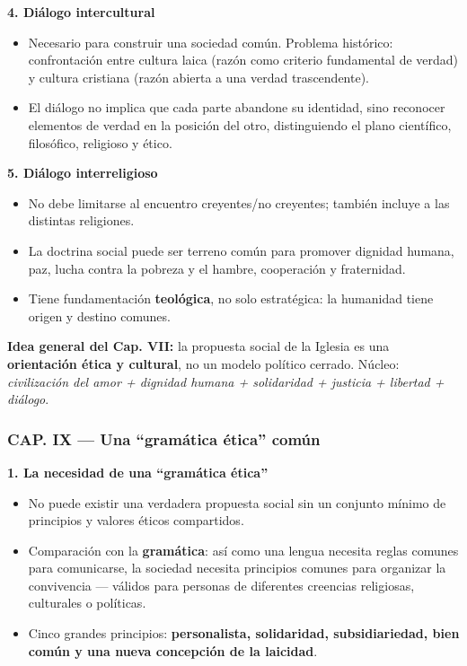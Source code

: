 \documentclass[10pt,a4paper]{article}
\begin{document}
\medskip\noindent \textbf{4. Diálogo intercultural}\par\nopagebreak
\begin{itemize}
\item Necesario para construir una sociedad común. Problema histórico: confrontación entre cultura laica (razón como criterio fundamental de verdad) y cultura cristiana (razón abierta a una verdad trascendente).
\item El diálogo no implica que cada parte abandone su identidad, sino reconocer elementos de verdad en la posición del otro, distinguiendo el plano científico, filosófico, religioso y ético.
\end{itemize}

\medskip\noindent \textbf{5. Diálogo interreligioso}\par\nopagebreak
\begin{itemize}
\item No debe limitarse al encuentro creyentes/no creyentes; también incluye a las distintas religiones.
\item La doctrina social puede ser terreno común para promover dignidad humana, paz, lucha contra la pobreza y el hambre, cooperación y fraternidad.
\item Tiene fundamentación \textbf{teológica}, no solo estratégica: la humanidad tiene origen y destino comunes.
\end{itemize}

\noindent \textbf{Idea general del Cap. VII:} la propuesta social de la Iglesia es una \textbf{orientación ética y cultural}, no un modelo político cerrado. Núcleo: \textit{civilización del amor + dignidad humana + solidaridad + justicia + libertad + diálogo}.\par\smallskip



\subsubsection{CAP. IX --- Una ``gramática ética'' común}

\medskip\noindent \textbf{1. La necesidad de una ``gramática ética''}\par\nopagebreak
\begin{itemize}
\item No puede existir una verdadera propuesta social sin un conjunto mínimo de principios y valores éticos compartidos.
\item Comparación con la \textbf{gramática}: así como una lengua necesita reglas comunes para comunicarse, la sociedad necesita principios comunes para organizar la convivencia --- válidos para personas de diferentes creencias religiosas, culturales o políticas.
\item Cinco grandes principios: \textbf{personalista, solidaridad, subsidiariedad, bien común y una nueva concepción de la laicidad}.
\end{itemize}
\end{document}

